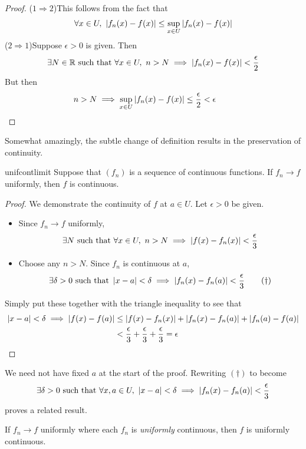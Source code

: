 \begin{proof}
($1\Rightarrow 2$)\quad This follows from the fact that
\[\forall x\in U,\ \nm{f_n(x)-f(x)}\le\sup_{x\in U}\nm{f_n(x)-f(x)}\]
($2\Rightarrow 1$)\quad Suppose $\epsilon>0$ is given. Then
\[\exists N\in\mathbb{R}\text{ such that }\forall x\in U,\ n>N\implies\left| f_n(x)-f(x)\right|<\frac\epsilon 2\]
But then
\[n>N\implies\sup_{x\in U}\left| f_n(x)-f(x)\right|\le\frac\epsilon 2<\epsilon\tag*{\qedhere}\]
\end{proof}



Somewhat amazingly, the subtle change of definition results in the preservation of continuity.

\begin{thm}{}{unifcontlimit}
Suppose that $(f_n)$ is a sequence of continuous functions. If $f_n\to f$ uniformly, then $f$ is continuous.
\end{thm}

\begin{proof}
We demonstrate the continuity of $f$ at $a\in U$. Let $\epsilon>0$ be given.
\begin{itemize}
  \item Since $f_n\to f$ uniformly,
	\[\exists N\text{ such that }\forall x\in U,\ n>N\implies\left| f(x)-f_n(x)\right|<\frac\epsilon 3\]
	\item Choose any $n>N$. Since $f_n$ is continuous at $a$,
	\[\exists \delta>0\text{ such that }\left| x-a\right|<\delta\implies\left| f_n(x)-f_n(a)\right| <\frac\epsilon 3\tag{$\dag$}\]
\end{itemize}
Simply put these together with the triangle inequality to see that
\begin{align*}
\left| x-a\right|<\delta\implies\left| f(x)-f(a)\right|&\le\left| f(x)-f_n(x)\right|+\left| f_n(x)-f_n(a)\right|+\left| f_n(a)-f(a)\right|\\
&<\frac\epsilon 3+\frac\epsilon 3+\frac\epsilon 3=\epsilon \tag*{\qedhere}
\end{align*}
\end{proof}

We need not have fixed $a$ at the start of the proof. Rewriting $(\dag)$ to become
\[\exists\delta>0\text{ such that }\forall x,a\in U,\ \nm{x-a}<\delta\implies\nm{f_n(x)-f_n(a)}<\frac\epsilon 3\]
proves a related result.

\begin{cor}{}{}
If $f_n\to f$ uniformly where each $f_n$ is \emph{uniformly} continuous, then $f$ is uniformly continuous.
\end{cor}

\vfil\goodbreak


